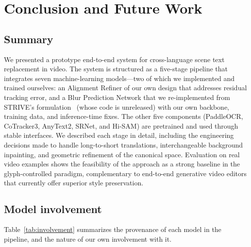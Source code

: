 \section{Conclusion and Future Work}
\label{sec:conclusion}

\subsection{Summary}
\label{sec:conclusion:summary}

We presented a prototype end-to-end system for cross-language scene
text replacement in video. The system is structured as a five-stage
pipeline that integrates seven machine-learning models---two of
which we implemented and trained ourselves: an Alignment Refiner
of our own design that addresses residual tracking error, and a
Blur Prediction Network that we re-implemented from STRIVE's
formulation~\citep{subramanian2021strive} (whose code is
unreleased) with our own backbone, training data, and
inference-time fixes. The other five components (PaddleOCR,
CoTracker3, AnyText2, SRNet, and Hi-SAM) are pretrained and used
through stable interfaces. We described each stage in detail,
including the engineering decisions made to handle long-to-short
translations, interchangeable background inpainting, and geometric
refinement of the canonical space. Evaluation on real video
examples shows the feasibility of the approach as a strong
baseline in the glyph-controlled paradigm, complementary to
end-to-end generative video editors that currently offer superior
style preservation.

\subsection{Model involvement}
\label{sec:conclusion:involvement}

Table~\ref{tab:involvement} summarizes the provenance of each model
in the pipeline, and the nature of our own involvement with it.

